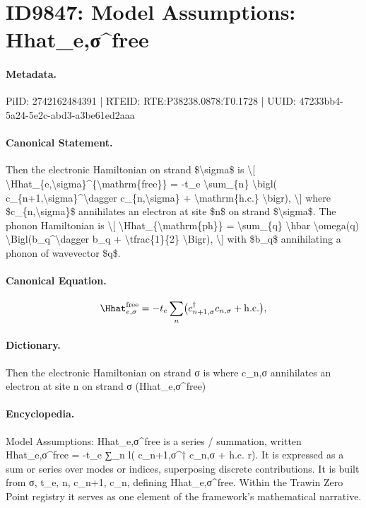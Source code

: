 \section*{ID9847: Model Assumptions: Hhat\_e,σ\textasciicircum{}free}
\paragraph{Metadata.}
PiID: 2742162484391 | RTEID: RTE:P38238.0878:T0.1728 | UUID: 47233bb4-5a24-5e2c-abd3-a3be61ed2aaa

\paragraph{Canonical Statement.}
Then the electronic Hamiltonian on strand \$\textbackslash{}sigma\$ is \textbackslash{}[ \textbackslash{}Hhat\_\{e,\textbackslash{}sigma\}\textasciicircum{}\{\textbackslash{}mathrm\{free\}\} = -t\_e \textbackslash{}sum\_\{n\} \textbackslash{}bigl( c\_\{n+1,\textbackslash{}sigma\}\textasciicircum{}\textbackslash{}dagger c\_\{n,\textbackslash{}sigma\} + \textbackslash{}mathrm\{h.c.\} \textbackslash{}bigr), \textbackslash{}] where \$c\_\{n,\textbackslash{}sigma\}\$ annihilates an electron at site \$n\$ on strand \$\textbackslash{}sigma\$. The phonon Hamiltonian is \textbackslash{}[ \textbackslash{}Hhat\_\{\textbackslash{}mathrm\{ph\}\} = \textbackslash{}sum\_\{q\} \textbackslash{}hbar \textbackslash{}omega(q) \textbackslash{}Bigl(b\_q\textasciicircum{}\textbackslash{}dagger b\_q + \textbackslash{}tfrac\{1\}\{2\} \textbackslash{}Bigr), \textbackslash{}] with \$b\_q\$ annihilating a phonon of wavevector \$q\$.

\paragraph{Canonical Equation.}
\[
\Hhat_{e,\sigma}^{\mathrm{free}} = -t_e \sum_{n} \bigl( c_{n+1,\sigma}^\dagger c_{n,\sigma} + \mathrm{h.c.} \bigr),
\]

\paragraph{Dictionary.}
Then the electronic Hamiltonian on strand σ is where c\_n,σ annihilates an electron at site n on strand σ (Hhat\_e,σ\textasciicircum{}free)

\paragraph{Encyclopedia.}
Model Assumptions: Hhat\_e,σ\textasciicircum{}free is a series / summation, written Hhat\_e,σ\textasciicircum{}free = -t\_e ∑\_n l( c\_n+1,σ\textasciicircum{}† c\_n,σ + h.c. r). It is expressed as a sum or series over modes or indices, superposing discrete contributions. It is built from σ, t\_e, n, c\_n+1, c\_n, defining Hhat\_e,σ\textasciicircum{}free. Within the Trawin Zero Point registry it serves as one element of the framework's mathematical narrative.
